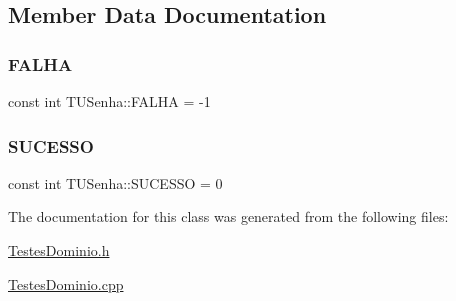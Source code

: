 \subsection{Member Data Documentation}
\mbox{\label{class_t_u_senha_a71eb0d9005b2d36da6a8530c0dd31842}} 
\subsubsection{\texorpdfstring{F\+A\+L\+HA}{FALHA}}
{\footnotesize\ttfamily const int T\+U\+Senha\+::\+F\+A\+L\+HA = -\/1\hspace{0.3cm}{\ttfamily [static]}}

\mbox{\label{class_t_u_senha_a1a1dabe034b25a899150c95acbc0684c}} 
\subsubsection{\texorpdfstring{S\+U\+C\+E\+S\+SO}{SUCESSO}}
{\footnotesize\ttfamily const int T\+U\+Senha\+::\+S\+U\+C\+E\+S\+SO = 0\hspace{0.3cm}{\ttfamily [static]}}



The documentation for this class was generated from the following files\+:\begin{DoxyCompactItemize}
\item 
\hyperlink{_testes_dominio_8h}{Testes\+Dominio.\+h}\item 
\hyperlink{_testes_dominio_8cpp}{Testes\+Dominio.\+cpp}\end{DoxyCompactItemize}
